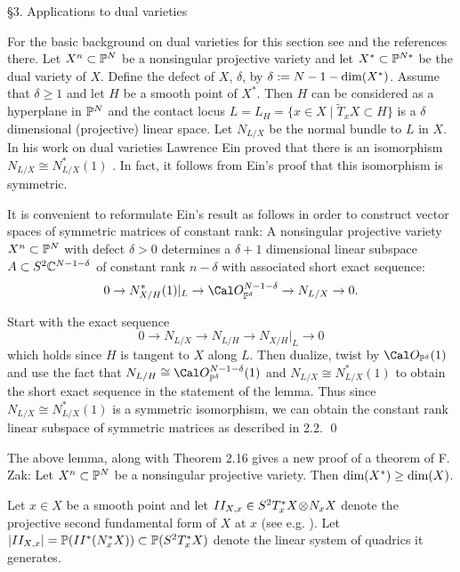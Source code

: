 \heading \S 3. Applications to dual varieties \endheading

For the basic background on dual varieties 
for this section see \cite{E} and the references
there. Let $X^n \subset \Bbb P^{N}$ be a nonsingular projective variety and let
$X^* \subset \Bbb P^{N*}$ be the dual variety of $X$. Define the defect
of $X$, $\delta$, by $\delta := N-1 - \text{dim}(X^*)$. Assume that $\delta \ge 1$
and
let $H$ be a  smooth point of $X^*$. Then $H$ can
be considered as a hyperplane in $\Bbb P^{N}$ and the contact locus
$L = L_H = \{ x \in X \mid \tilde T_x X \subset H \} $ is a $\delta$ 
dimensional (projective) linear space.
 Let $N_{L/X}$ be the normal bundle to $L$ in $X$.
In his work on dual varieties Lawrence Ein proved that there is an isomorphism 
$N_{L/X} \cong N_{L/X}^*(1)$ \cite{E, Theorem 2.2}.
In fact, it follows from Ein's proof that this isomorphism is symmetric.

It is convenient to reformulate Ein's result as
follows in order to  construct vector spaces of symmetric matrices of
constant rank:
 A nonsingular projective variety
$X^n \subset \Bbb P^{N}$  with defect $\delta > 0$ determines a
$\delta +1$ dimensional linear subspace $A \subset S^2 \Bbb C^{N-1-\delta}$
of constant rank $n-\delta$ with associated short exact sequence:
$$
0 \to N_{X/H}^*(1) \vert_L \to \co_{\pp{\delta}}^{N-1-\delta}
\to N_{L/X} \to 0.
$$  
\endproclaim

Start with the exact sequence
$$
0 \to N_{L/X} \to N_{L/H} \to N_{X/H} \vert_L \to 0
$$
which holds since $H$ is tangent to $X$ along $L$. 
Then dualize, twist by $\co_{\pp{\delta}}(1)$ and use the fact that
$N_{L/H} \cong \co_{\pp{\delta}}^{N-1-\delta}(1)$ and $N_{L/X} \cong N_{L/X}^*(1)$
to obtain the short exact sequence in the statement of the lemma. Thus 
since $N_{L/X} \cong N_{L/X}^*(1)$ is a symmetric isomorphism, 
we can obtain the constant rank linear subspace of symmetric matrices as 
described in 2.2.
\qed
\enddemo
 
The above lemma, along with Theorem 2.16 gives a new proof of a theorem
of F. Zak:
 \cite{Z, Cor. 10, pg. 39}
Let $X^n \subset \Bbb P^{N}$ be a nonsingular projective variety.
Then $\text{dim}(X^*) \ge \text{dim}(X)$. 
\endproclaim

Let $x\in X$ be a smooth point and let $II_{X,x}\in S^2T^*_xX\!\otimes\! N_xX$
denote the projective second fundamental form of $X$ at $x$
(see e.g. \cite{Lan}).
Let $|II_{X,x}|=\Bbb P (II^*(N^*_xX)) \subset \Bbb P (S^2T^*_xX)$ 
denote the linear system of quadrics it generates. 

